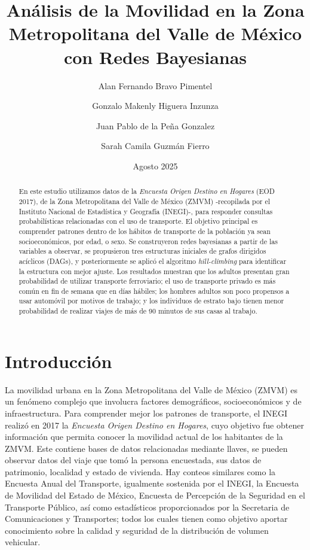 \documentclass[twocolumn]{article}
\title{Análisis de la Movilidad en la Zona Metropolitana del Valle de México con Redes Bayesianas}
\author{
Alan Fernando Bravo Pimentel \and
Gonzalo Makenly Higuera Inzunza \and
Juan Pablo de la Peña Gonzalez \and
Sarah Camila Guzmán Fierro}
\date{Agosto 2025}
\begin{document}
\maketitle

\begin{abstract}
En este estudio utilizamos datos de la \textit{Encuesta Origen Destino en Hogares} (EOD 2017), de la Zona Metropolitana del Valle de México (ZMVM) -recopilada por el Instituto Nacional de Estadística y Geografía (INEGI)-, para responder consultas probabilísticas relacionadas con el uso de transporte. El objetivo principal es comprender patrones dentro de los hábitos de transporte de la población ya sean socioeconómicos, por edad, o sexo. Se construyeron redes bayesianas a partir de las variables a observar, se propusieron tres estructuras iniciales de grafos dirigidos acíclicos (DAGs), y posteriormente se aplicó el algoritmo \textit{hill-climbing} para identificar la estructura con mejor ajuste. Los resultados muestran que los adultos presentan gran probabilidad de utilizar transporte ferroviario; el uso de transporte privado es más común en fin de semana que en días hábiles; los hombres adultos son poco propensos a usar automóvil por motivos de trabajo; y los individuos de estrato bajo tienen menor probabilidad de realizar viajes de más de 90 minutos de sus casas al trabajo.
\end{abstract}

\section{Introducción}
La movilidad urbana en la Zona Metropolitana del Valle de México (ZMVM) es un fenómeno complejo que involucra factores demográficos, socioeconómicos y de infraestructura. Para comprender mejor los patrones de transporte, el INEGI realizó en 2017 la \textit{Encuesta Origen Destino en Hogares}, cuyo objetivo fue obtener información que permita conocer la movilidad actual de los habitantes de la ZMVM. Este contiene bases de datos relacionadas mediante llaves, se pueden observar datos del viaje que tomó la persona encuestada, sus datos de patrimonio, localidad y estado de vivienda. Hay conteos similares como la Encuesta Anual del Transporte, igualmente sostenida por el INEGI, la Encuesta de Movilidad del Estado de México, Encuesta de Percepción de la Seguridad en el Transporte Público, así como estadísticos proporcionados por la Secretaria de Comunicaciones y Transportes; todos los cuales tienen como objetivo aportar conocimiento sobre la calidad y seguridad de la distribución de volumen vehicular.
\end{document}

